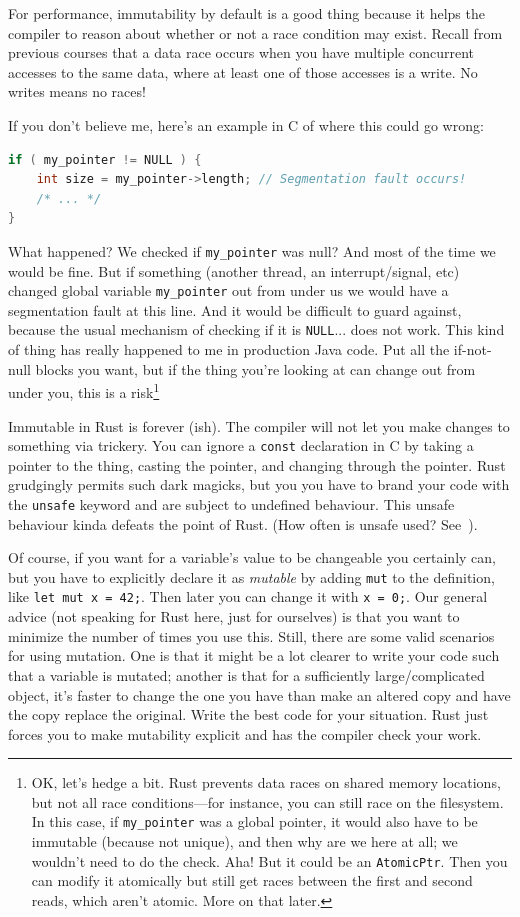 For performance, immutability by default is a good thing because it helps the compiler to reason about whether or not a race condition may exist. Recall from previous courses that a data race occurs when you have multiple concurrent accesses to the same data, where at least one of those accesses is a write. No writes means no races! 

If you don't believe me, here's an example in C of where this could go wrong:
\begin{lstlisting}[language=C]
if ( my_pointer != NULL ) {
    int size = my_pointer->length; // Segmentation fault occurs!
    /* ... */
}
\end{lstlisting}

What happened? We checked if \texttt{my\_pointer} was null? And most of the time we would be fine. But if something (another thread, an interrupt/signal, etc) changed global variable \texttt{my\_pointer} out from under us we would have a segmentation fault at this line. And it would be difficult to guard against, because the usual mechanism of checking if it is \texttt{NULL}... does not work. This kind of thing has really happened to me in production Java code. Put all the if-not-null blocks you want, but if the thing you're looking at can change out from under you, this is a risk\footnote{OK, let's hedge a bit. Rust prevents data races on shared memory locations, but not all race conditions---for instance, you can still race on the filesystem. In this case, if \texttt{my\_pointer} was a global pointer, it would also have to be immutable (because not unique), and then why are we here at all; we wouldn't need to do the check. Aha! But it could be an \texttt{AtomicPtr}. Then you can modify it atomically but still get races between the first and second reads, which aren't atomic. More on that later.}

Immutable in Rust is forever (ish). The compiler will not let you make changes to something via trickery. You can ignore a \texttt{const} declaration in C by taking a pointer to the thing, casting the pointer, and changing through the pointer. Rust grudgingly permits such dark magicks, but you you have to brand your code with the \texttt{unsafe} keyword and are subject to undefined behaviour. This unsafe behaviour kinda defeats the point of Rust. (How often is unsafe used? See~\cite{astrauskas20:_how_progr_unsaf_rust}).

Of course, if you want for a variable's value to be changeable you certainly can, but you have to explicitly declare it as \textit{mutable} by adding \texttt{mut} to the definition, like \texttt{let mut x = 42;}. Then later you can change it with \texttt{x = 0;}. Our general advice (not speaking for Rust here, just for ourselves) is that you want to minimize the number of times you use this. Still, there are some valid scenarios for using mutation. One is that it might be a lot clearer to write your code such that a variable is mutated; another is that for a sufficiently large/complicated object, it's faster to change the one you have than make an altered copy and have the copy replace the original. Write the best code for your situation. Rust just forces you to make mutability explicit and has the compiler check your work.

